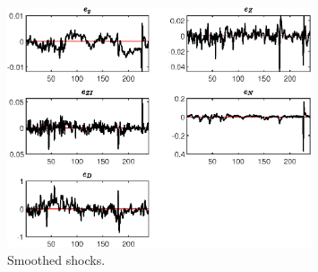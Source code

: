  
\begin{figure}[H]
\centering 
\includegraphics[width=0.80\textwidth]{BRS_growth_sep/graphs/BRS_growth_sep_SmoothedShocks1}
\caption{Smoothed shocks.}\label{Fig:SmoothedShocks:1}
\end{figure}


